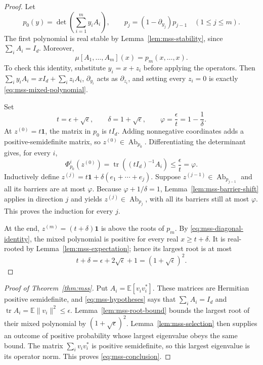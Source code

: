 \begin{proof}
Let
\[
 p_0(y)=\det\left(\sum_{i=1}^m y_iA_i\right),
 \qquad
 p_j=(1-\partial_{y_j})p_{j-1}\quad(1\leq j\leq m).
\]
The first polynomial is real stable by
Lemma~\ref{lem:mss-stability}, since $\sum_iA_i=I_d$.
Moreover,
\begin{equation}
 \mu[A_1,\ldots,A_m](x)=p_m(x,\ldots,x).
 \label{eq:mss-diagonal-identity}
\end{equation}
To check this identity, substitute $y_i=x+z_i$ before applying the
operators.  Then $\sum_i y_iA_i=xI_d+\sum_i z_iA_i$,
$\partial_{y_i}$ acts as $\partial_{z_i}$, and setting every $z_i=0$
is exactly \eqref{eq:mss-mixed-polynomial}.

Set
\[
 t=\epsilon+\sqrt\epsilon,
 \qquad \delta=1+\sqrt\epsilon,
 \qquad \varphi=\frac\epsilon t=1-\frac1\delta.
\]
At $z^{(0)}=t\mathbf1$, the matrix in $p_0$ is $tI_d$.
Adding nonnegative coordinates adds a positive-semidefinite matrix,
so $z^{(0)}\in\operatorname{Ab}_{p_0}$.
Differentiating the determinant gives, for every $i$,
\[
 \Phi_{p_0}^i(z^{(0)})
 =\operatorname{tr}((tI_d)^{-1}A_i)
 \leq\frac\epsilon t=\varphi.
\]
Inductively define
$z^{(j)}=t\mathbf1+\delta(e_1+\cdots+e_j)$.
Suppose $z^{(j-1)}\in\operatorname{Ab}_{p_{j-1}}$ and all its
barriers are at most $\varphi$.
Because $\varphi+1/\delta=1$, Lemma~\ref{lem:mss-barrier-shift}
applies in direction $j$ and yields
$z^{(j)}\in\operatorname{Ab}_{p_j}$, with all its barriers still
at most $\varphi$.  This proves the induction for every $j$.

At the end, $z^{(m)}=(t+\delta)\mathbf1$ is above the roots of
$p_m$.  By \eqref{eq:mss-diagonal-identity}, the mixed polynomial
is positive for every real $x\geq t+\delta$.
It is real-rooted by Lemma~\ref{lem:mss-expectation}; hence its
largest root is at most
\[
 t+\delta=\epsilon+2\sqrt\epsilon+1
          =(1+\sqrt\epsilon)^2.
\]
\end{proof}

\begin{proof}[Proof of Theorem~\ref{thm:mss}]
Put $A_i=\mathbb E[v_iv_i^*]$.  These matrices are Hermitian
positive semidefinite, and \eqref{eq:mss-hypotheses} says that
$\sum_iA_i=I_d$ and
$\operatorname{tr}A_i=\mathbb E\|v_i\|^2\leq\epsilon$.
Lemma~\ref{lem:mss-root-bound} bounds the largest root of their
mixed polynomial by $(1+\sqrt\epsilon)^2$.
Lemma~\ref{lem:mss-selection} then supplies an outcome of positive
probability whose largest eigenvalue obeys the same bound.
The matrix $\sum_i v_iv_i^*$ is positive semidefinite, so this
largest eigenvalue is its operator norm.  This proves
\eqref{eq:mss-conclusion}.
\end{proof}
